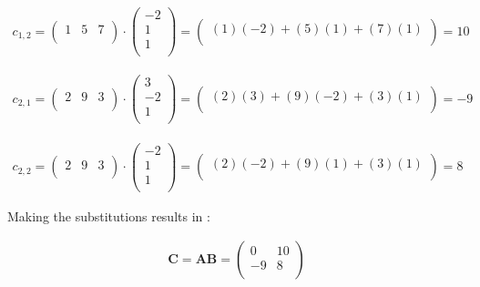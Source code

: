 \begin{gather}
c_{1,2} =
\begin{pmatrix}
1 & 5 & 7 \\
\end{pmatrix}
\cdot
\begin{pmatrix}
-2 \\
1 \\
1 \\
\end{pmatrix}
=
\begin{pmatrix}
(1)(-2) +(5)(1) + (7)(1)\\
\end{pmatrix}
= 10
\end{gather}


\begin{gather}
c_{2,1} =
\begin{pmatrix}
2 & 9 & 3 \\
\end{pmatrix}
\cdot
\begin{pmatrix}
3 \\
-2 \\
1 \\
\end{pmatrix}
=
\begin{pmatrix}
(2)(3) +(9)(-2) + (3)(1)\\
\end{pmatrix}
= -9
\end{gather}


\begin{gather}
c_{2,2} =
\begin{pmatrix}
2 & 9 & 3 \\
\end{pmatrix}
\cdot
\begin{pmatrix}
-2 \\
1 \\
1 \\
\end{pmatrix}
=
\begin{pmatrix}
(2)(-2) +(9)(1) + (3)(1)\\
\end{pmatrix}
= 8
\end{gather}

Making the substitutions results in :

\begin{gather}
\mathbf{C}=\mathbf{A}\mathbf{B}=
\begin{pmatrix}
0 & 10 \\
-9 & 8 \\
\end{pmatrix}
\end{gather}

